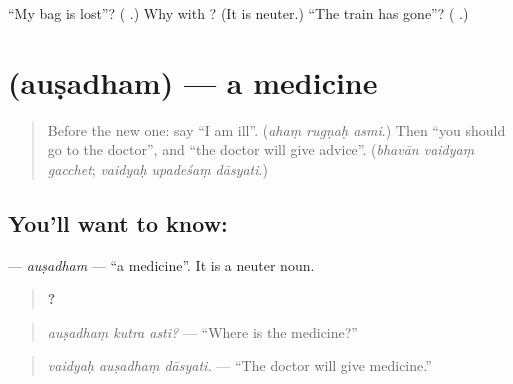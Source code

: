 \begin{tcolorbox}[breakable,colback=teal!4,colframe=teal!35!black,title={Before you move on}]
\textquotedblleft{}My bag is lost\textquotedblright{}? (\textbf{  }.) Why \textbf{} with \textbf{}? (It is neuter.) \textquotedblleft{}The train has gone\textquotedblright{}? (\textbf{ }.)
\end{tcolorbox}
\section[\texorpdfstring{\sk{औषधम्} (auṣadham)}{औषधम् (auṣadham)}]{ (auṣadham) — a medicine}

\label{lesson:SA-C281-ausadham}



\begin{quote}
Before the new one: say \textquotedblleft{}I am ill\textquotedblright{}. (\emph{ahaṃ rugṇaḥ asmi}.) Then \textquotedblleft{}you should go to the doctor\textquotedblright{}, and \textquotedblleft{}the doctor will give advice\textquotedblright{}. (\emph{bhavān vaidyaṃ gacchet}; \emph{vaidyaḥ upadeśaṃ dāsyati}.)
\end{quote}

\subsection*{You'll want to know: }
\textbf{} — \emph{auṣadham} — \textquotedblleft{}a medicine\textquotedblright{}. It is a neuter noun.

\begin{quote}
\textbf{  ?}
\end{quote}

\begin{quote}
\emph{auṣadhaṃ kutra asti?} — \textquotedblleft{}Where is the medicine?\textquotedblright{}
\end{quote}

\begin{quote}
\textbf{  }
\end{quote}

\begin{quote}
\emph{vaidyaḥ auṣadhaṃ dāsyati.} — \textquotedblleft{}The doctor will give medicine.\textquotedblright{}
\end{quote}

\begin{quote}
\textbf{  }
\end{quote}

